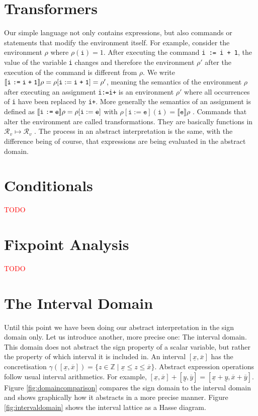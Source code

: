 \section{Transformers}

Our simple language not only contains expressions, but also commands or statements that modify the environment itself. For example, consider the environment $\rho$ where $\rho(\mathtt{i})=1$. After executing the command \texttt{i := i + 1}, the value of the variable \texttt{i} changes and therefore the environment $\rho'$ after the execution of the command is different from $\rho$. We write $\llbracket \texttt{i\;:=\;i\;+\;1} \rrbracket\rho=\rho[\mathtt{i}:=\texttt{i\;+\;1}]=\rho'$, meaning the semantics of the environment $\rho$ after executing an assignment \texttt{i\;:=\;i\;+} is an environment $\rho'$ where all occurrences of \texttt{i} have been replaced by \texttt{i\;+}. 
More generally the semantics of an assignment is defined as $\llbracket \texttt{i\;:=\;e} \rrbracket\rho=\rho[\mathtt{i}:=\texttt{e}]$ with $\rho[\mathtt{i}:=\texttt{e}](\mathtt{i})=\llbracket\mathtt{e}\rrbracket\rho$ \cite{cousot2011}. Commands that alter the environment are called transformations. They are basically functions in $\mathcal{R}_v\mapsto\mathcal{R}_v$ \cite{scott1971}.
The process in an abstract interpretation is the same, with the difference being of course, that expressions are being evaluated in the abstract domain.

\section{Conditionals}
\textcolor{red}{TODO}
\section{Fixpoint Analysis}
\textcolor{red}{TODO}

\section{The Interval Domain}





Until this point we have been doing our abstract interpretation in the sign domain only. Let us introduce another, more precise one: The interval domain. This domain does not abstract the sign property of a scalar variable, but rather the property of which interval it is included in. An interval $[\underline{x},\overline{x}]$ has the concretisation $\gamma([\underline{x},\overline{x}])=\{z\in\mathbb{Z} \;|\; \underline{x}\leq z \leq \overline{x}\}$. Abstract expression operations follow usual interval arithmetics. For example, $[\underline{x},\overline{x}]+[\underline{y},\overline{y}]=[\underline{x}+\underline{y},\overline{x}+\overline{y}]$. Figure \ref{fig:domaincomparison} compares the sign domain to the interval domain and shows graphically how it abstracts in a more precise manner. Figure \ref{fig:intervaldomain} shows the interval lattice as a Hasse diagram.

